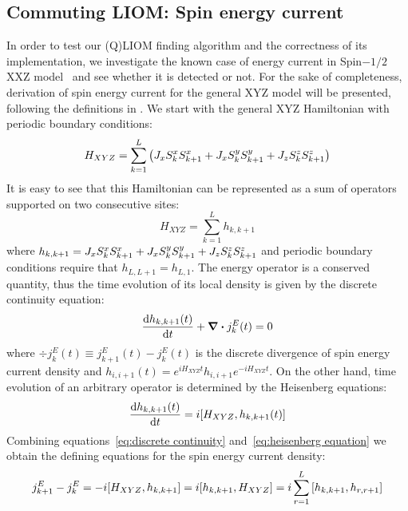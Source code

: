 \subsection{Commuting LIOM: Spin energy current\label{sec:energy current}}
In order to test our (Q)LIOM finding algorithm and the correctness of its implementation, we investigate the known case of
energy current in Spin\(-1/2\) XXZ model~\autocite*{Mierzejewski2015Approx} and see whether it is detected or not.
For the sake of completeness, derivation of
spin energy current for the general XYZ model will be presented, following the definitions in \textcite{Zotos1997}.
We start with the general XYZ Hamiltonian with periodic boundary conditions:
\begin{equation}
  H_{XYZ} = \sum_{k=1}^L  \left( J_{x} S^{x}_{k}S^{x}_{k+1} + J_{x} S^{y}_{k}S^{y}_{k+1} + J_{z} S^{z}_{k}S^{z}_{k+1} \right)
\end{equation}
It is easy to see that this Hamiltonian can be represented as a sum of operators supported on two consecutive sites:
\begin{equation}
  H_{XYZ} = \sum_{k=1}^L h_{k,k+1}
\end{equation}
where \(h_{k,k+1} = J_{x} S^{x}_{k}S^{x}_{k+1} + J_{x} S^{y}_{k}S^{y}_{k+1} + J_{z} S^{z}_{k}S^{z}_{k+1} \) and periodic boundary conditions
require that \(h_{L,L+1} = h_{L,1}\). The energy operator is a conserved quantity, thus the time evolution of its local density
is given by the discrete continuity equation:
\begin{equation}
  \dv{h_{k,k+1}(t)}{t} + \div{j_{k}^{E}(t)} = 0
  \label{eq:discrete continuity}
\end{equation}
where \(\div{j_{k}^E(t)} \equiv j_{k+1}^E(t) - j_{k}^E(t)\) is the discrete divergence of spin energy current density and \(h_{i,i+1}(t) = e^{i H_{XYZ}t} h_{i,i+1} e^{-i H_{XYZ} t}\).
On the other hand, time evolution of an arbitrary operator is determined
by the Heisenberg equations:
\begin{equation}
  \dv{h_{k,k+1}(t)}{t} = i \comm{H_{XYZ}}{h_{k,k+1}(t)}
  \label{eq:heisenberg equation}
\end{equation}
Combining equations~\eqref{eq:discrete continuity} and~\eqref{eq:heisenberg equation} we obtain the defining equations for
the spin energy current density:
\begin{equation}
  j_{k+1}^E - j_{k}^E = - i \comm{H_{XYZ}}{h_{k,k+1}} = i \comm{h_{k,k+1}}{H_{XYZ}} = i \sum_{r=1}^L \comm{h_{k,k+1}}{h_{r,r+1}}
  \label{eq:energy current defining equation}
\end{equation}
